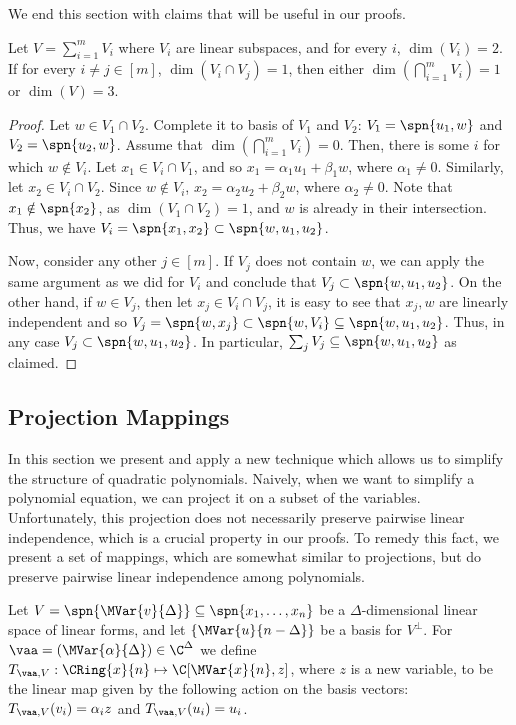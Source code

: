 We end this section with claims that will be useful in our proofs. 

 
\begin{claim}\label{cla:linear-spaces-intersaction }
Let $V = \sum_{i=1}^m V_i$ where $V_i$ are linear subspaces, and for every $i$, $\dim(V_i) = 2$. If for every $i\neq j \in [m]$, $\dim(V_i\cap V_j) = 1$, then either $\dim(\bigcap_{i=1}^m V_i) = 1$ or $\dim(V)=3$. 
\end{claim}
\begin{proof}
Let  $w \in V_1\cap V_2$. Complete it to basis of $V_1$ and $V_2$: $V_1 = \spn{u_1,w}$ and  $V_2 = \spn{u_2,w}$. Assume that $\dim(\bigcap_{i=1}^m V_i) = 0$. Then, there is some $i$ for which $w \notin V_i$.
Let
$x_1 \in V_i\cap V_1$, and so $x_1 = \alpha_1 u_1 + \beta_1 w$, where $\alpha_1 \neq 0$. Similarly, let $x_2 \in V_i\cap V_2$. Since $w \notin V_i$, $x_2 = \alpha_2 u_2 + \beta_2 w$, where $\alpha_2 \neq 0$.  Note that $x_1 \notin \spn{ x_2}$, as $\dim(V_1\cap V_2) = 1$, and $w$ is already in their intersection. Thus, we have $V_i = \spn{x_1,x_2} \subset \spn{w, u_1, u_2}$.

Now, consider any other $j \in [m]$. If $V_j$ does not contain $w$, we can apply the same argument as we did for $V_i$ and conclude that $V_j \subset \spn{w,u_1,u_2}$. On the other hand, if $w \in V_j$, then let $x_j \in V_i\cap V_j$, it is easy to see that $x_j, w$ are linearly independent and so $V_j = \spn{w,x_j} \subset \spn{w,V_i} \subseteq \spn{w, u_1,u_2}$. Thus, in any case $V_j \subset \spn{w, u_1,u_2}$. In particular, $\sum_j V_j \subseteq \spn{w, u_1,u_2}$ as claimed.
\end{proof}
\subsection{Projection Mappings}\label{sec:z-map}

In this section we present and apply a new technique which allows us to simplify the structure of quadratic polynomials.
Naively, when we want to simplify a polynomial equation, we can project it on a subset of the variables.
Unfortunately, this projection does not necessarily preserve pairwise linear independence, which is a crucial property in our proofs. 
To remedy this fact, we present a set of mappings, which are somewhat similar to projections, but do preserve pairwise linear independence among polynomials.
\begin{definition}\label{def:z-mapping}
Let $V = \spn{\MVar{v}{\Delta}}\subseteq \spn{x_1,\ldots,x_n}$ be a $\Delta$-dimensional linear space of linear forms, and let $\{\MVar{u}{{n-\Delta}}\}$ be a basis for $V^\perp$. For $\vaa = (\MVar{\alpha}{\Delta})\in \C^{\Delta}$ we define $T_{\vaa, V} : \CRing{x}{n} \mapsto \C[\MVar{x}{n},z]$, where $z$ is a new variable, to be the linear map given by the following action on the basis vectors: $T_{\vaa, V}(v_i) = \alpha_i z$ and $T_{\vaa, V}(u_i)=u_i$.
\end{definition}


